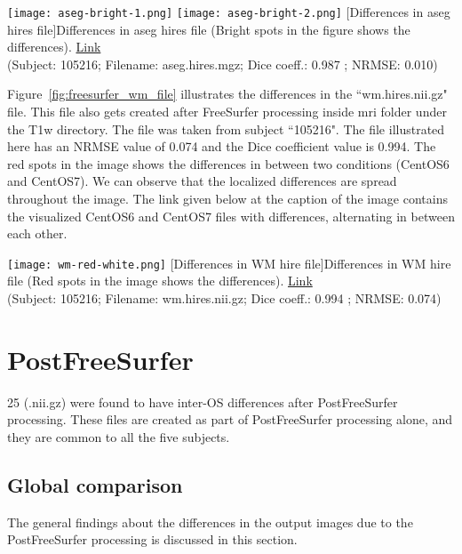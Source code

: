 \begin{center}
\texttt{[image: aseg-bright-1.png]}%
\texttt{[image: aseg-bright-2.png]}
  [Differences in aseg hires file]{Differences in aseg hires file (Bright spots in the figure shows the differences). \href{https://drive.google.com/file/d/1WUwWp5muXvotbMQqTqR5LcMyncH1ET3P/view?usp=sharing}{Link}\\(Subject: 105216; Filename: aseg.hires.mgz; Dice coeff.: 0.987 ; NRMSE: 0.010)}
\label{fig:freesurfer_aseg_file}
\end{center}

Figure~\ref{fig:freesurfer_wm_file} illustrates the differences in the ``wm.hires.nii.gz" file. This file also gets created after FreeSurfer processing inside mri folder under the T1w directory. The file was taken from subject ``105216". The file illustrated here has an NRMSE value of 0.074 and the Dice coefficient value is 0.994. The red spots in the image shows the differences in between two conditions (CentOS6 and CentOS7). We can observe that the localized differences are spread throughout the image. The link given below at the caption of the image contains the visualized CentOS6 and CentOS7 files with differences, alternating in between each other.

\begin{center}
\texttt{[image: wm-red-white.png]}
[Differences in WM hire file]{Differences in WM hire file (Red spots in the image shows the differences). \href{https://drive.google.com/file/d/1i6WpH6Le5xry4j-RtRZxt0_NP3Ulm5AT/view?usp=sharing}{Link}\\(Subject: 105216; Filename: wm.hires.nii.gz; Dice coeff.: 0.994 ; NRMSE: 0.074)}
\label{fig:freesurfer_wm_file}
\end{center}

\section{PostFreeSurfer}\label{sec:Postfreesurfer}
25 (.nii.gz) were found to have inter-OS differences after PostFreeSurfer processing. These files are created as part of PostFreeSurfer processing alone, and they are common to all the five subjects.

\subsection{Global comparison}
The general findings about the differences in the output images due to the PostFreeSurfer processing is discussed in this section.

